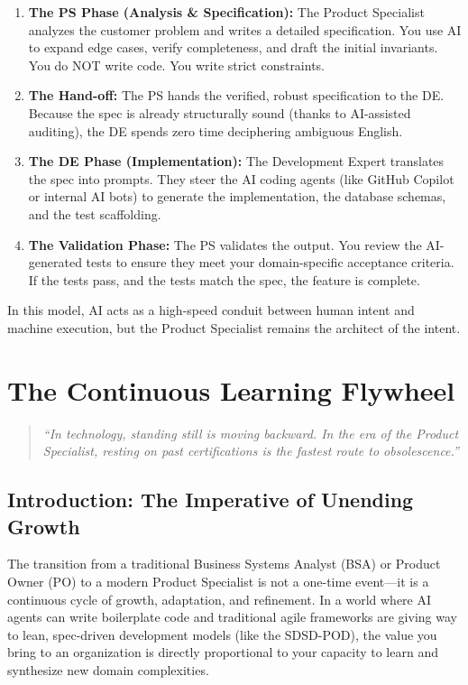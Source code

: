 \begin{enumerate}
\def\labelenumi{\arabic{enumi}.}
\tightlist
\item
  \textbf{The PS Phase (Analysis \& Specification):} The Product
  Specialist analyzes the customer problem and writes a detailed
  specification. You use AI to expand edge cases, verify completeness,
  and draft the initial invariants. You do NOT write code. You write
  strict constraints.
\item
  \textbf{The Hand-off:} The PS hands the verified, robust specification
  to the DE. Because the spec is already structurally sound (thanks to
  AI-assisted auditing), the DE spends zero time deciphering ambiguous
  English.
\item
  \textbf{The DE Phase (Implementation):} The Development Expert
  translates the spec into prompts. They steer the AI coding agents
  (like GitHub Copilot or internal AI bots) to generate the
  implementation, the database schemas, and the test scaffolding.
\item
  \textbf{The Validation Phase:} The PS validates the output. You review
  the AI-generated tests to ensure they meet your domain-specific
  acceptance criteria. If the tests pass, and the tests match the spec,
  the feature is complete.
\end{enumerate}

In this model, AI acts as a high-speed conduit between human intent and
machine execution, but the Product Specialist remains the architect of
the intent.

\chapter{The Continuous Learning
Flywheel}\label{the-continuous-learning-flywheel-1}

\begin{quote}
\emph{``In technology, standing still is moving backward. In the era of
the Product Specialist, resting on past certifications is the fastest
route to obsolescence.''}
\end{quote}

\section{Introduction: The Imperative of Unending
Growth}\label{introduction-the-imperative-of-unending-growth}

The transition from a traditional Business Systems Analyst (BSA) or
Product Owner (PO) to a modern Product Specialist is not a one-time
event---it is a continuous cycle of growth, adaptation, and refinement.
In a world where AI agents can write boilerplate code and traditional
agile frameworks are giving way to lean, spec-driven development models
(like the SDSD-POD), the value you bring to an organization is directly
proportional to your capacity to learn and synthesize new domain
complexities.


